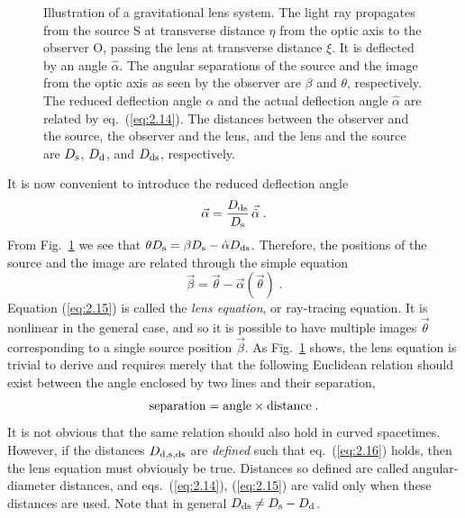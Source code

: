 \documentclass[a4paper,10pt]{article} %
\begin{document}
\begin{figure}[ht] %
\begin{center}
\begin{minipage}[t]{0.6\hsize}
\end{minipage}
\end{center}
\caption{Illustration of a gravitational lens system. The light ray
  propagates from the source S at transverse distance $\eta$ from the
  optic axis to the observer O, passing the lens at transverse
  distance $\xi$. It is deflected by an angle $\hat\alpha$. The
  angular separations of the source and the image from the optic axis
  as seen by the observer are $\beta$ and $\theta$, respectively. The
  reduced deflection angle $\alpha$ and the actual deflection angle
  $\hat\alpha$ are related by eq.\ (\protect\ref{eq:2.14}). The
  distances between the observer and the source, the observer and the
  lens, and the lens and the source are $D_{\rm s}$, $D_{\rm d}$, and
  $D_{\rm ds}$, respectively.}
\label{NB:fig2.4}
\end{figure}

It is now convenient to introduce the reduced deflection angle
\begin{equation}
  \vec\alpha = \frac{D_{\rm ds}}{D_{\rm s}}\,\vec{\hat\alpha}\;.
\label{eq:2.14}
\end{equation}
From Fig.\ \ref{NB:fig2.4} we see that $\theta D_{\rm s}=\beta D_{\rm
s}-{\hat\alpha}D_{\rm ds}$. Therefore, the positions of the source and
the image are related through the simple equation
\begin{equation}
  \vec\beta = \vec\theta - \vec\alpha(\vec\theta)\;.
\label{eq:2.15}
\end{equation}
Equation (\ref{eq:2.15}) is called the {\em lens equation\/}, or
ray-tracing equation. It is nonlinear in the general case, and so it
is possible to have multiple images $\vec\theta$ corresponding to a
single source position $\vec\beta$. As Fig.\ \ref{NB:fig2.4} shows,
the lens equation is trivial to derive and requires merely that the
following Euclidean relation should exist between the angle enclosed
by two lines and their separation,
\begin{equation}
  {\rm separation} = {\rm angle}\times{\rm distance}\;.
\label{eq:2.16}
\end{equation}
It is not obvious that the same relation should also hold in curved
spacetimes. However, if the distances $D_{\rm d,s,ds}$ are {\em
defined\/} such that eq.\ (\ref{eq:2.16}) holds, then the lens
equation must obviously be true. Distances so defined are called
angular-diameter distances, and eqs.\ (\ref{eq:2.14}), (\ref{eq:2.15})
are valid only when these distances are used. Note that in general
$D_{\rm ds}\ne D_{\rm s}-D_{\rm d}$.
\end{document}
